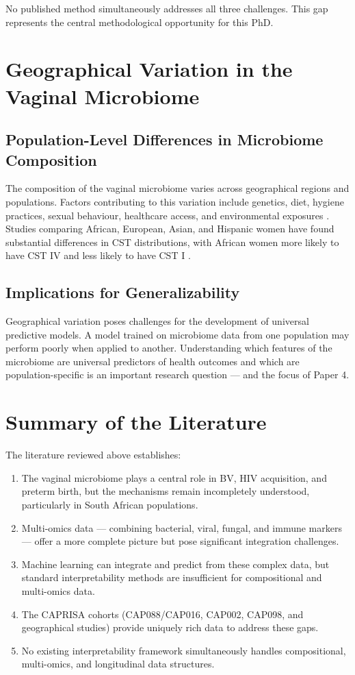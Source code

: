 \documentclass[12pt,a4paper]{report}
\begin{document}
No published method simultaneously addresses all three challenges. This gap represents the central methodological opportunity for this PhD.

\section{Geographical Variation in the Vaginal Microbiome}

\subsection{Population-Level Differences in Microbiome Composition}

The composition of the vaginal microbiome varies across geographical regions and populations. Factors contributing to this variation include genetics, diet, hygiene practices, sexual behaviour, healthcare access, and environmental exposures \cite{roachford2022, gupta2022}. Studies comparing African, European, Asian, and Hispanic women have found substantial differences in CST distributions, with African women more likely to have CST IV and less likely to have CST I \cite{ravel2011, roachford2022}.

\subsection{Implications for Generalizability}

Geographical variation poses challenges for the development of universal predictive models. A model trained on microbiome data from one population may perform poorly when applied to another. Understanding which features of the microbiome are universal predictors of health outcomes and which are population-specific is an important research question --- and the focus of Paper 4.

\section{Summary of the Literature}

The literature reviewed above establishes:

\begin{enumerate}
    \item The vaginal microbiome plays a central role in BV, HIV acquisition, and preterm birth, but the mechanisms remain incompletely understood, particularly in South African populations.
    \item Multi-omics data --- combining bacterial, viral, fungal, and immune markers --- offer a more complete picture but pose significant integration challenges.
    \item Machine learning can integrate and predict from these complex data, but standard interpretability methods are insufficient for compositional and multi-omics data.
    \item The CAPRISA cohorts (CAP088/CAP016, CAP002, CAP098, and geographical studies) provide uniquely rich data to address these gaps.
    \item No existing interpretability framework simultaneously handles compositional, multi-omics, and longitudinal data structures.
\end{enumerate}
\end{document}
